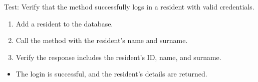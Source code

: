 \documentclass[letterpaper,10pt,english]{sphinxmanual}
\begin{document}
\begin{fulllineitems}
\label{\detokenize{test:test.test_residetnt.test_login_success}}
\pysigstartsignatures
\pysiglinewithargsret
{}
{}
{}
\pysigstopsignatures
\sphinxAtStartPar
Test: Verify that the method successfully logs in a resident with valid credentials.
\begin{description}
\begin{enumerate}
%
\item {} 
\sphinxAtStartPar
Add a resident to the database.

\item {} 
\sphinxAtStartPar
Call the  method with the resident’s name and surname.

\item {} 
\sphinxAtStartPar
Verify the response includes the resident’s ID, name, and surname.

\end{enumerate}

\begin{itemize}
\item {} 
\sphinxAtStartPar
The login is successful, and the resident’s details are returned.

\end{itemize}

\end{description}

\end{fulllineitems}

\end{document}
